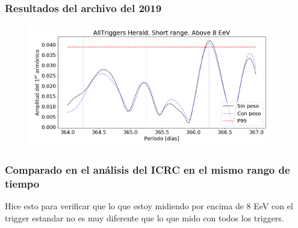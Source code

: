       \subsubsection{Resultados del archivo del 2019}
      \begin{figure}[H]
        \centering
        \includegraphics[width=0.95\textwidth]{../0_Introduccion/AllTriggers/AllTriggers_2019_Short_range_Above_8_EeV.png}
      \end{figure}

      \subsubsection{Comparado en el análisis del ICRC en el mismo rango de tiempo}
        Hice esto para verificar que  lo que estoy midiendo por encima de 8 EeV con el trigger estandar no es muy diferente que lo que mido con todos los triggers.

